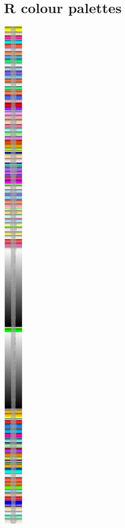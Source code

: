 \documentclass[
]{book}
\begin{document}
\appendix


\chapter{R colour palettes}\label{colours}

\includegraphics{_main_files/figure-latex/unnamed-chunk-370-1.pdf}
\end{document}

